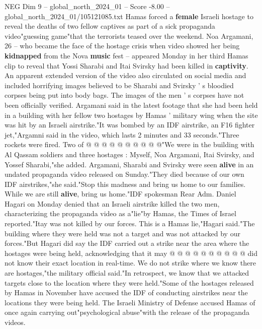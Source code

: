 \begin{textsample}{NEG Dim 9 – global\_north\_2024\_01 – Score -8.00 – global\_north\_2024\_01/105121085.txt}  \label{ex:f9_neg_194}
Hamas forced a \textbf{female} Israeli hostage to reveal the deaths of two fellow captives as part of a sick propaganda video"guessing game"that the terrorists teased over the weekend.
Noa Argamani, 26 -- who became the face of the hostage crisis when video showed her being \textbf{kidnapped} from the Nova \textbf{music} fest -- appeared Monday in her third Hamas clip to reveal that Yossi Sharabi and Itai Svirsky had been killed in \textbf{captivity}.
An apparent extended version of the video also circulated on social media and included horrifying images believed to be Sharabi and Svirsky ' s bloodied corpses being put into body bags.
The images of the men ' s corpses have not been officially verified.
Argamani said in the latest footage that she had been held in a building with her fellow two hostages by Hamas ' military wing when the site was hit by an Israeli airstrike."It was bombed by an IDF airstrike, an F16 fighter jet,"Argamni said in the video, which lasts 2 minutes and 33 seconds."Three rockets were fired.
Two of @ @ @ @ @ @ @ @ @ @"We were in the building with Al Qassam soldiers and three hostages : Myself, Noa Argamani, Itai Svirsky, and Yossef Sharabi,"she added.
Argamani, Sharabi and Svirsky were seen \textbf{alive} in an undated propaganda video released on Sunday."They died because of our own IDF airstrikes,"she said."Stop this madness and bring us home to our families.
While we are still \textbf{alive}, bring us home."IDF spokesman Rear Adm.
Daniel Hagari on Monday denied that an Israeli airstrike killed the two men, characterizing the propaganda video as a"lie"by Hamas, the Times of Israel reported."Itay was not killed by our forces.
This is a Hamas lie,"Hagari said."The building where they were held was not a target and was not attacked by our forces."But Hagari did say the IDF carried out a strike near the area where the hostages were being held, acknowledging that it may @ @ @ @ @ @ @ @ @ @ did not know their exact location in real-time.
We do not strike where we know there are hostages,"the military official said."In retrospect, we know that we attacked targets close to the location where they were held."Some of the hostages released by Hamas in November have accused the IDF of conducting airstrikes near the locations they were being held.
The Israeli Ministry of Defense accused Hamas of once again carrying out"psychological abuse"with the release of the propaganda videos.

\end{textsample}

